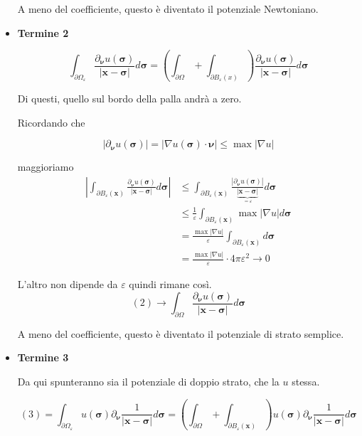 \documentclass[10pt,a4paper,twoside,openright]{book}
\newcommand{\x}{\mathbf{x}}
\begin{document}
\begin{dimostrazione}
\begin{itemize}
	A meno del coefficiente, questo è diventato il potenziale Newtoniano.
	\item \textbf{Termine 2}

	\begin{equation*}
	\int _{\partial \Omega _{\varepsilon }}\frac{\partial _{\bm{\nu}} u(\bm{\sigma })}{| \x -\bm{\sigma }| } d\bm{\sigma } =\left(\int _{\partial \Omega } +\int _{\partial B_{\varepsilon }( x)}\right)\frac{\partial _{\bm{\nu}} u(\bm{\sigma })}{| \x -\bm{\sigma }| } d\bm{\sigma }
	\end{equation*}

	Di questi, quello sul bordo della palla andrà a zero.

	Ricordando che

	\begin{equation*}
	| \partial _{\bm{\nu}} u(\bm{\sigma })| =| \nabla u(\bm{\sigma }) \cdotp \bm{\nu}| \leqslant \max| \nabla u| 
	\end{equation*}

	maggioriamo\begin{align*}
	\left| \int _{\partial B_{\varepsilon }(\x)}\frac{\partial _{\bm{\nu}} u(\bm{\sigma })}{| \x -\bm{\sigma }| } d\bm{\sigma }\right|  & \leqslant \int _{\partial B_{\varepsilon }(\x)}\frac{| \partial _{\bm{\nu}} u(\bm{\sigma })| }{\underbrace{| \x -\bm{\sigma }| }_{=\varepsilon }} d\bm{\sigma }\\
	 & \leqslant \frac{1}{\varepsilon }\int _{\partial B_{\varepsilon }(\x)}\max| \nabla u| d\bm{\sigma }\\
	 & =\frac{\max| \nabla u| }{\varepsilon }\int _{\partial B_{\varepsilon }(\x)} d\bm{\sigma }\\
	 & =\frac{\max| \nabla u| }{\varepsilon } \cdotp 4\pi \varepsilon ^{2}\rightarrow 0
	\end{align*}

	L'altro non dipende da $\displaystyle \varepsilon $ quindi rimane così.\begin{equation*}
	( 2)\rightarrow \int _{\partial \Omega }\frac{\partial _{\bm{\nu}} u(\bm{\sigma })}{| \x -\bm{\sigma }| } d\bm{\sigma }
	\end{equation*}

	A meno del coefficiente, questo è diventato il potenziale di strato semplice.
	\item \textbf{Termine 3}

	Da qui spunteranno sia il potenziale di doppio strato, che la $\displaystyle u$ stessa.

	\begin{equation*}
	( 3) =\int _{\partial \Omega _{\varepsilon }} u(\bm{\sigma }) \partial _{\bm{\nu}}\frac{1}{| \x -\bm{\sigma }| } d\bm{\sigma } =\left(\int _{\partial \Omega } +\int _{\partial B_{\varepsilon }(\x)}\right) u(\bm{\sigma }) \partial _{\bm{\nu}}\frac{1}{| \x -\bm{\sigma }| } d\bm{\sigma }
	\end{equation*}


\end{itemize}
\end{dimostrazione}
\end{document}
